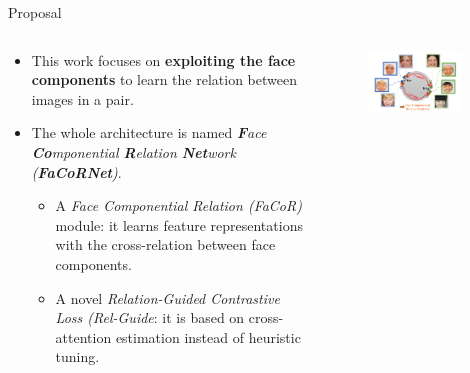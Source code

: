 \documentclass[aspectratio=169,xcolor=dvipsnames]{beamer}
\begin{document}
\begin{frame}{Proposal}
    \begin{columns}[T] %
        \begin{column}{0.6\textwidth} %
            \begin{itemize}
                \item This work focuses on \textbf{exploiting the face components} to learn the relation between images in a pair. %
                \item The whole architecture is named \textit{\textbf{F}ace \textbf{Co}mponential \textbf{R}elation \textbf{Net}work (\textbf{FaCoRNet})}.
                    \begin{itemize}
                        \item A \textit{Face Componential Relation (FaCoR)} module: it learns feature representations with the cross-relation between face components.
                        \item A novel \textit{Relation-Guided Contrastive Loss (Rel-Guide}: it is based on cross-attention estimation instead of heuristic tuning.
                    \end{itemize}
            \end{itemize}
        \end{column}
        \begin{column}{0.4\textwidth}
            \begin{figure}
                \centering
                \includegraphics[width=0.9\textwidth]{imgs/F1.png}

\end{figure}
\end{column}
\end{columns}
\end{frame}
\end{document}
